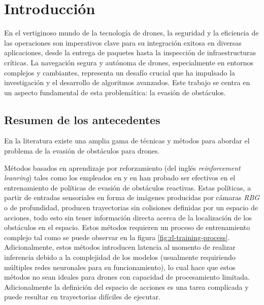 \chapter{Introducción}
    

    \par En el vertiginoso mundo de la tecnología de drones, la seguridad y la eficiencia de las operaciones son imperativos clave para su integración exitosa en diversas aplicaciones, desde la entrega de paquetes hasta la inspección de infraestructuras críticas. La navegación segura y autónoma de drones, especialmente en entornos complejos y cambiantes, representa un desafío crucial que ha impulsado la investigación y el desarrollo de algoritmos avanzados. Este trabajo se centra en un aspecto fundamental de esta problemática: la evasión de obstáculos.

\section{Resumen de los antecedentes}

    \par En la literatura existe una amplia gama de técnicas y métodos para abordar el problema de la evasión de obstáculos para drones. 
    
    \par Métodos basados en aprendizaje por reforzamiento (del inglés \textit{reinforcement leanring}) tales como los empleados en \cite{Tu2023} y en \cite{Xue2021} han probado ser efectivos en el entrenamiento de políticas de evasión de obstáculos reactivas. Estas políticas, a partir de entradas sensoriales en forma de imágenes producidas por cámaras \textit{RBG} o de profundidad, producen trayectorias sin colisiones definidas por un espacio de acciones, todo esto sin tener información directa acerca de la localización de los obstáculos en el espacio. Estos métodos requieren un proceso de entrenamiento complejo tal como se puede observar en la figura \ref{fig:rl-training-process}. Adicionalmente, estos métodos introducen latencia al momento de realizar inferencia debido a la complejidad de los modelos (usualmente requiriendo múltiples redes neuronales para su funcionamiento), lo cual hace que estos métodos no sean ideales para drones con capacidad de procesamiento limitada. Adicionalmente la definición del espacio de acciones es una tarea complicada y puede resultar en trayectorias difíciles de ejecutar.

